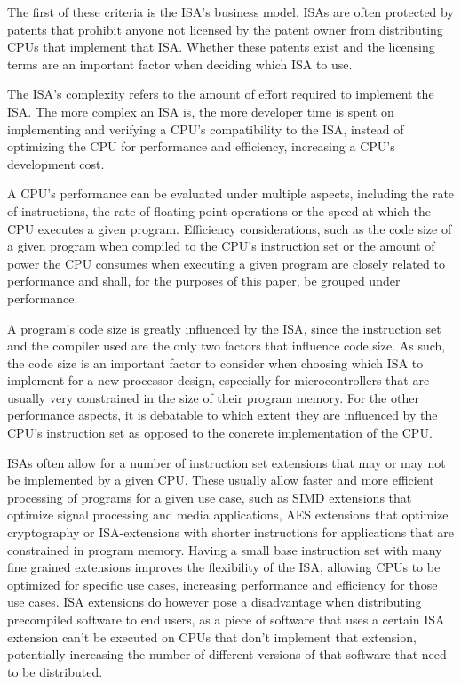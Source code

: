 \documentclass[conference]{IEEEtran}
\begin{document}
The first of these criteria is the \gls{ISA}'s business model. \glspl{ISA} are often protected by patents that prohibit anyone not licensed
by the patent owner from distributing \glspl{CPU} that implement that \gls{ISA}. \cite{Tang2011} Whether these patents exist and the licensing terms
are an important factor when deciding which \gls{ISA} to use.

The \gls{ISA}'s complexity refers to the amount of effort required to implement the \gls{ISA}. The more complex an \gls{ISA} is, the more developer
time is spent on implementing and verifying a \gls{CPU}'s compatibility to the \gls{ISA}, instead of optimizing the \gls{CPU} for performance and efficiency,
increasing a \gls{CPU}'s development cost.

A \gls{CPU}'s performance can be evaluated under multiple aspects, including the rate of instructions, the rate of floating point operations or
the speed at which the CPU executes a given program. Efficiency considerations, such as the code size of a given program when compiled to the \gls{CPU}'s
instruction set or the amount of power the \gls{CPU} consumes when executing a given program are closely related to performance and shall, for the
purposes of this paper, be grouped under performance.

A program's code size is greatly influenced by the \gls{ISA}, since the instruction set and the compiler used are the only two factors that influence
code size. As such, the code size is an important factor to consider when choosing which \gls{ISA} to implement for a new processor design, especially
for microcontrollers that are usually very constrained in the size of their program memory.
For the other performance aspects, it is debatable to which extent they are influenced by the \gls{CPU}'s instruction set as opposed
to the concrete implementation of the CPU. \cite{Blem2013} \cite{Akram2017}

\glspl{ISA} often allow for a number of instruction set extensions that may or may not be implemented by a given \gls{CPU}. These usually allow
faster and more efficient processing of programs for a given use case, such as \gls{SIMD} extensions that optimize signal processing and media applications,
\gls{AES} extensions that optimize cryptography or \gls{ISA}-extensions with shorter instructions for applications that are constrained in program memory.
Having a small base instruction set with many fine grained extensions improves the flexibility of the \gls{ISA}, allowing \glspl{CPU} to be optimized for specific
use cases, increasing performance and efficiency for those use cases. \gls{ISA} extensions do however pose a disadvantage when distributing precompiled software
to end users, as a piece of software that uses a certain \gls{ISA} extension can't be executed on \glspl{CPU} that don't implement that extension, potentially
increasing the number of different versions of that software that need to be distributed.
\end{document}

